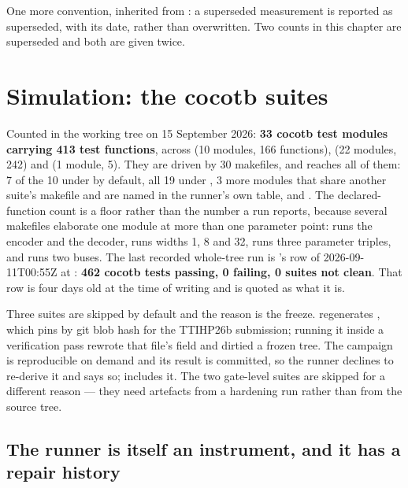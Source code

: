 One more convention, inherited from : a superseded measurement
is reported as superseded, with its date, rather than overwritten. Two
counts in this chapter are superseded and both are given twice.

\section{Simulation: the cocotb suites}
\label{sec:verif-cocotb}

Counted in the working tree on 15 September 2026: \textbf{33 cocotb test
modules carrying 413 test functions}, across  (10 modules,
166 functions),  (22 modules, 242) and
 (1 module, 5). They are driven by 30 makefiles, and
 reaches all of them: 7 of the 10 under
 by default, all 19 under , 3 more
modules that share another suite's makefile and are named in the
runner's own table, and . The declared-function count is a
floor rather than the number a run reports, because several makefiles
elaborate one module at more than one parameter point:
 runs the encoder and the decoder,
 runs widths 1, 8 and 32,  runs
three parameter triples, and  runs two buses.
The last recorded whole-tree run is 's row of
2026-09-11T00:55Z at : \textbf{462 cocotb tests passing, 0
failing, 0 suites not clean}. That row is four days old at the time of
writing and is quoted as what it is.

Three suites are skipped by default and the reason is the freeze.
 regenerates ,
which  pins by git blob hash for the TTIHP26b submission; running it inside a verification pass rewrote that file's
 field and dirtied a frozen tree. The campaign is
reproducible on demand and its result is committed, so the runner
declines to re-derive it and says so;  includes it.
The two gate-level suites are skipped for a different reason --- they
need artefacts from a hardening run rather than from the source tree.

\subsection{The runner is itself an instrument, and it has a repair history}


